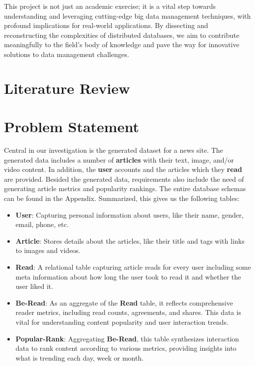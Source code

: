\documentclass{report}
\begin{document}
    This project is not just an academic exercise; it is a vital step towards understanding and leveraging cutting-edge big data management techniques, with profound implications for real-world applications. By dissecting and reconstructing the complexities of distributed databases, we aim to contribute meaningfully to the field's body of knowledge and pave the way for innovative solutions to data management challenges.


    \section{Literature Review}


    \section{Problem Statement}
    Central in our investigation is the generated dataset for a news site. The generated data includes a number of \textbf{articles} with their text, image, and/or video content. In addition, the \textbf{user} accounts and the articles which they \textbf{read} are provided. Besided the generated data, requirements also include the need of generating article metrics and popularity rankings. The entire database schemas can be found in the Appendix.
    Summarized, this gives us the following tables:

    \begin{itemize}
        \item \textbf{User}: Capturing personal information about users, like their name, gender, email, phone, etc.
        \item \textbf{Article}: Stores details about the articles, like their title and tags with links to images and videos.
        \item \textbf{Read}: A relational table capturing article reads for every user including some meta information about how long the user took to read it and whether the user liked it.
        \item \textbf{Be-Read}: As an aggregate of the \textbf{Read} table, it reflects comprehensive reader metrics, including read counts, agreements, and shares. This data is vital for understanding content popularity and user interaction trends.
        \item \textbf{Popular-Rank}: Aggregating \textbf{Be-Read}, this table synthesizes interaction data to rank content according to various metrics, providing insights into what is trending each day, week or month.
    \end{itemize}
\end{document}
